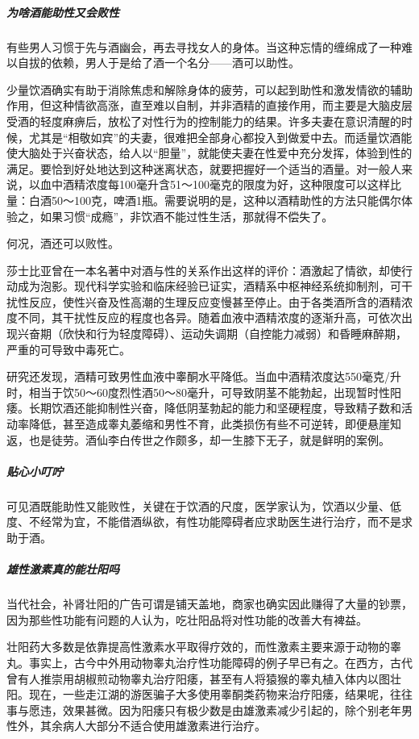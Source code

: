 \begin{enumerate}
\subparagraph{为啥酒能助性又会败性}

有些男人习惯于先与酒幽会，再去寻找女人的身体。当这种忘情的缠绵成了一种难以自拔的依赖，男人于是给了酒一个名分——酒可以助性。

少量饮酒确实有助于消除焦虑和解除身体的疲劳，可以起到助性和激发情欲的辅助作用，但这种情欲高涨，直至难以自制，并非酒精的直接作用，而主要是大脑皮层受酒的轻度麻痹后，放松了对性行为的控制能力的结果。许多夫妻在意识清醒的时候，尤其是“相敬如宾”的夫妻，很难把全部身心都投入到做爱中去。而适量饮酒能使大脑处于兴奋状态，给人以“胆量”，就能使夫妻在性爱中充分发挥，体验到性的满足。要恰到好处地达到这种迷离状态，就要把握好一个适当的酒量。对一般人来说，以血中酒精浓度每100毫升含51～100毫克的限度为好，这种限度可以这样比量：白酒50～100克，啤酒1瓶。需要说明的是，这种以酒精助性的方法只能偶尔体验之，如果习惯“成瘾”，非饮酒不能过性生活，那就得不偿失了。

何况，酒还可以败性。

莎士比亚曾在一本名著中对酒与性的关系作出这样的评价：酒激起了情欲，却使行动成为泡影。现代科学实验和临床经验已证实，酒精系中枢神经系统抑制剂，可干扰性反应，使性兴奋及性高潮的生理反应变慢甚至停止。由于各类酒所含的酒精浓度不同，其干扰性反应的程度也各异。随着血液中酒精浓度的逐渐升高，可依次出现兴奋期（欣快和行为轻度障碍）、运动失调期（自控能力减弱）和昏睡麻醉期，严重的可导致中毒死亡。

研究还发现，酒精可致男性血液中睾酮水平降低。当血中酒精浓度达550毫克/升时，相当于饮50～60度烈性酒50～80毫升，可导致阴茎不能勃起，出现暂时性阳痿。长期饮酒还能抑制性兴奋，降低阴茎勃起的能力和坚硬程度，导致精子数和活动率降低，甚至造成睾丸萎缩和男性不育，此类损伤有些不可逆转，即便悬崖知返，也是徒劳。酒仙李白传世之作颇多，却一生膝下无子，就是鲜明的案例。

\subparagraph{贴心小叮咛}

可见酒既能助性又能败性，关键在于饮酒的尺度，医学家认为，饮酒以少量、低度、不经常为宜，不能借酒纵欲，有性功能障碍者应求助医生进行治疗，而不是求助于酒。

\subparagraph{雄性激素真的能壮阳吗}

当代社会，补肾壮阳的广告可谓是铺天盖地，商家也确实因此赚得了大量的钞票，因为那些性功能有问题的人认为，吃壮阳品将对性功能的改善大有裨益。

壮阳药大多数是依靠提高性激素水平取得疗效的，而性激素主要来源于动物的睾丸。事实上，古今中外用动物睾丸治疗性功能障碍的例子早已有之。在西方，古代曾有人推崇用胡椒煎动物睾丸治疗阳痿，甚至有人将猿猴的睾丸植入体内以图壮阳。现在，一些走江湖的游医骗子大多使用睾酮类药物来治疗阳痿，结果呢，往往事与愿违，效果甚微。因为阳痿只有极少数是由雄激素减少引起的，除个别老年男性外，其余病人大部分不适合使用雄激素进行治疗。


\end{enumerate}
